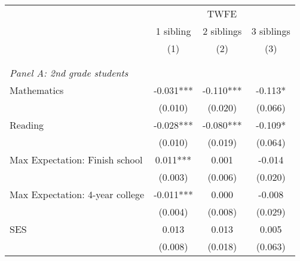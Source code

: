 \makeatletter
{}
{
\makeatother
\begin{tabular}{lccc}
\toprule
\cmidrule(lr){2-4}
& \multicolumn{3}{c}{TWFE}  \\
\cmidrule(lr){2-4}
& 1 sibling & 2 siblings & 3 siblings  \\
\cmidrule(lr){2-2} \cmidrule(lr){3-3} \cmidrule(lr){4-4}
& (1) & (2) & (3)\\
\bottomrule
&  &  &  \\
&  &  &   \\
\multicolumn{4}{l}{\textit{Panel A: 2nd grade students}} \\
\hspace{3mm}Mathematics&      -0.031***&      -0.110***&      -0.113*  \\
                    &     (0.010)   &     (0.020)   &     (0.066)   \\
 
\hspace{3mm}Reading &      -0.028***&      -0.080***&      -0.109*  \\
                    &     (0.010)   &     (0.019)   &     (0.064)   \\
 
\hspace{3mm}Max Expectation: Finish school&       0.011***&       0.001   &      -0.014   \\
                    &     (0.003)   &     (0.006)   &     (0.020)   \\
 
\hspace{3mm}Max Expectation: 4-year college&      -0.011***&       0.000   &      -0.008   \\
                    &     (0.004)   &     (0.008)   &     (0.029)   \\
 
\hspace{3mm}SES     &       0.013   &       0.013   &       0.005   \\
                    &     (0.008)   &     (0.018)   &     (0.063)   \\
 

\end{tabular}}
